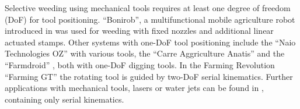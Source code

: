 \documentclass[runningheads]{llncs}
\begin{document}
Selective weeding using mechanical tools requires at least one degree of freedom (DoF) for tool positioning. 
``Bonirob'', a multifunctional mobile agriculture robot introduced in \cite{Ruckelshausen2009} was used for weeding with fixed nozzles and additional linear actuated stamps. 
Other systems with one-DoF tool positioning include the ``Naio Technologies OZ'' \cite{NaioTechnologies} with various tools, the ``Carre Aggriculture Anatis'' \cite{CarbonRobotics} and the ``Farmdroid'' \cite{Farmdroid}, both with one-DoF digging tools. 
In the Farming Revolution ``Farming GT'' \cite{farming_revolution} the rotating tool is guided by two-DoF serial kinematics. 
Further applications with mechanical tools, lasers or water jets can be found in \cite{Zhang2022}, containing only serial kinematics. 
\end{document}
